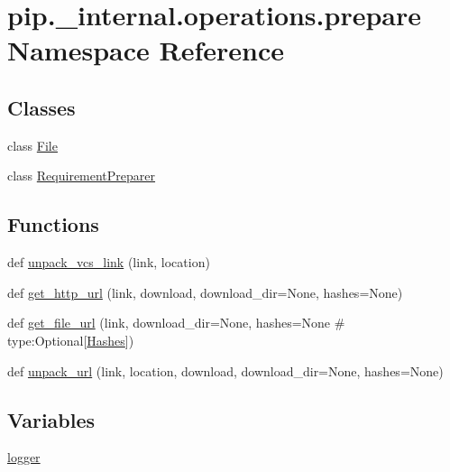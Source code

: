 \hypertarget{namespacepip_1_1__internal_1_1operations_1_1prepare}{}\section{pip.\+\_\+internal.\+operations.\+prepare Namespace Reference}
\label{namespacepip_1_1__internal_1_1operations_1_1prepare}
\subsection*{Classes}
\begin{DoxyCompactItemize}
\item 
class \hyperlink{classpip_1_1__internal_1_1operations_1_1prepare_1_1File}{File}
\item 
class \hyperlink{classpip_1_1__internal_1_1operations_1_1prepare_1_1RequirementPreparer}{Requirement\+Preparer}
\end{DoxyCompactItemize}
\subsection*{Functions}
\begin{DoxyCompactItemize}
\item 
def \hyperlink{namespacepip_1_1__internal_1_1operations_1_1prepare_a51749831006429999baef3eb8b71c8a0}{unpack\+\_\+vcs\+\_\+link} (link, location)
\item 
def \hyperlink{namespacepip_1_1__internal_1_1operations_1_1prepare_a1b810f7f0cec5fe7b3b2296548d80f6d}{get\+\_\+http\+\_\+url} (link, download, download\+\_\+dir=None, hashes=None)
\item 
def \hyperlink{namespacepip_1_1__internal_1_1operations_1_1prepare_a10a9df8c34e4824a1b3ce7dc3616736d}{get\+\_\+file\+\_\+url} (link, download\+\_\+dir=None, hashes=None \# type\+:\+Optional\mbox{[}\hyperlink{classpip_1_1__internal_1_1utils_1_1hashes_1_1Hashes}{Hashes}\mbox{]})
\item 
def \hyperlink{namespacepip_1_1__internal_1_1operations_1_1prepare_a7d45b87bf33198f796af1e437cf4bebe}{unpack\+\_\+url} (link, location, download, download\+\_\+dir=None, hashes=None)
\end{DoxyCompactItemize}
\subsection*{Variables}
\begin{DoxyCompactItemize}
\item 
\hyperlink{namespacepip_1_1__internal_1_1operations_1_1prepare_a5711b6d724733a124cdb792d179f0940}{logger}
\end{DoxyCompactItemize}



